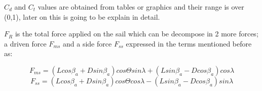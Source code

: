 $C_{d}$ and $C_{t}$ values are obtained from tables or graphics and their range is over (0,1), later on this is going to be explain in detail. \par 
$F_{R}$ is the total force applied on the sail which can be decompose in 2 more forces; a driven force $F_{ms}$ and a side force $F_{ss}$ expressed in the terms mentioned before as:\par
\begin{equation}\label{eq:drive_sail_force}
    F_{ms}= (L cos \beta_{a}+ D sin \beta_{a})cos \Theta sin \lambda + (L sin \beta_{a}-D cos\beta_{a})cos \lambda
\end{equation}
\begin{equation}\label{eq:side_sail_force}
    F_{ss}=(L cos \beta_{a}+ D sin \beta_{a})cos \Theta cos \lambda - (L sin \beta_{a}-D cos\beta_{a})sin \lambda
\end{equation}

